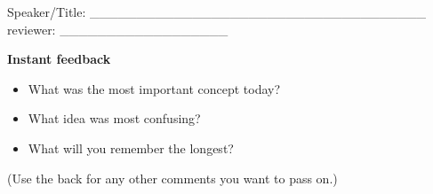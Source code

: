 \documentclass[14pt]{extarticle}
\begin{document}
Speaker/Title: \_\_\_\_\_\_\_\_\_\_\_\_\_\_\_\_\_\_\_\_\_\_\_\_\_\_\_\_\_\_\_\_\_\_\_\_ \hspace{.5in} reviewer: \_\_\_\_\_\_\_\_\_\_\_\_\_\_\_\_\_\_

\centerline{\bf\large Instant feedback}
\begin{itemize}
\item What was the most important concept today?
\vspace{2.in}
\item What idea was most confusing?
\vspace{2.in}
\item What will you remember the longest?
\vspace{2.in}
\end{itemize}
(Use the back for any other comments you want to pass on.)
\end{document}
